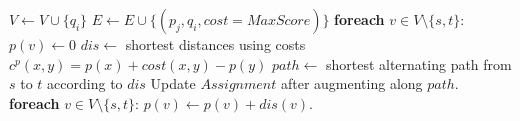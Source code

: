 \documentclass{article}
\begin{document}
\begin{enumerate}
\begin{minipage}[htb]{0.9\textwidth}
\begin{algorithm}[H]
\begin{algorithmic}[1]
                \EndFor
            \EndFor
        \EndIf
                \State $V\leftarrow V\cup\{q_i\}$
                    \State $E\leftarrow E\cup\{(p_j, q_i, cost = MaxScore)\}$
                \EndFor
            \EndFor
        \EndIf
        \State \textbf{foreach} $v\in V\setminus\{s,t\}$: $p(v)\leftarrow 0$
            \State $dis\leftarrow$ shortest distances using costs $c^p(x,y) = p(x) + cost(x,y) - p(y)$
            \State $path\leftarrow$ shortest alternating path from $s$ to $t$ according to $dis$
            \State Update $Assignment$ after augmenting along $path$.
            \State \textbf{foreach} $v\in V\setminus\{s,t\}$: $p(v)\leftarrow p(v) + dis(v)$. 
        \EndWhile
        \State {}
    \EndFunction
\end{algorithmic}
\end{algorithm}
\end{minipage}
~\\



\end{enumerate}
\end{document}
